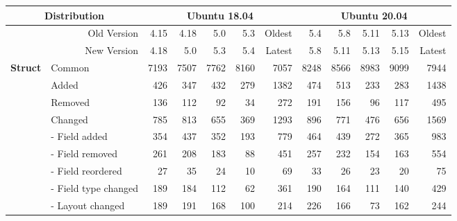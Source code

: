 \begin{table*}
  \centering

  \newcommand{\theadl}[2]{\multicolumn{#1}{c}{\bfseries #2}}
  \newcommand{\theadr}[2]{\multicolumn{#1}{c||}{\bfseries #2}}
  \newcommand{\mcolr}[2]{\multicolumn{#1}{r||}{#2}}
  \newcommand{\mrow}[2]{\multirow{#1}{*}{#2}}

  \setlength{\tabcolsep}{5pt}

  \begin{tabular}{c|l||r|r|r|r|r||r|r|r|r|r}
    \theadr{2}{Distribution}
     & \theadr{5}{Ubuntu 18.04}
     & \theadl{5}{Ubuntu 20.04}
    \\ \hline


    \mcolr{2}{Old Version}
     & 4.15                     & 4.18  & 5.0   & 5.3   & Oldest & 5.4   & 5.8   & 5.11  & 5.13  & Oldest         \\
    \mcolr{2}{New Version}
     & 4.18                     & 5.0   & 5.3   & 5.4   & Latest & 5.8   & 5.11  & 5.13  & 5.15  & Latest         \\ \hline\hline

    \mrow{9}{\bfseries Struct}
     & Common                   & 7193  & 7507  & 7762  & 8160   & 7057  & 8248  & 8566  & 8983  & 9099   & 7944  \\ \cline{2-12}
     & Added                    & 426   & 347   & 432   & 279    & 1382  & 474   & 513   & 233   & 283    & 1438  \\ \cline{2-12}
     & Removed                  & 136   & 112   & 92    & 34     & 272   & 191   & 156   & 96    & 117    & 495   \\ \cline{2-12}
     & Changed                  & 785   & 813   & 655   & 369    & 1293  & 896   & 771   & 476   & 656    & 1569  \\ \cline{2-12}
     & - Field added            & 354   & 437   & 352   & 193    & 779   & 464   & 439   & 272   & 365    & 983   \\ \cline{2-12}
     & - Field removed          & 261   & 208   & 183   & 88     & 451   & 257   & 232   & 154   & 163    & 554   \\ \cline{2-12}
     & - Field reordered        & 27    & 35    & 24    & 10     & 69    & 33    & 26    & 23    & 20     & 75    \\ \cline{2-12}
     & - Field type changed     & 189   & 184   & 112   & 62     & 361   & 190   & 164   & 111   & 140    & 429   \\ \cline{2-12}
     & - Layout changed         & 189   & 191   & 168   & 100    & 214   & 226   & 166   & 73    & 162    & 244   \\ \hline


\end{tabular}
\end{table*}
